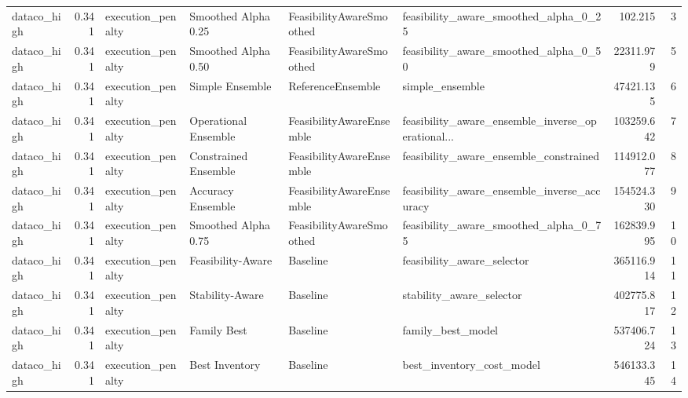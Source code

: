 \begin{table}
{\begin{tabular}{lrllllrr}
   dataco\_high &             0.341 &           execution\_penalty &   Smoothed Alpha 0.25 &  FeasibilityAwareSmoothed &              feasibility\_aware\_smoothed\_alpha\_0\_25 &       102.215 &               3 \\
   dataco\_high &             0.341 &           execution\_penalty &   Smoothed Alpha 0.50 &  FeasibilityAwareSmoothed &              feasibility\_aware\_smoothed\_alpha\_0\_50 &     22311.979 &               5 \\
   dataco\_high &             0.341 &           execution\_penalty &       Simple Ensemble &         ReferenceEnsemble &                                    simple\_ensemble &     47421.135 &               6 \\
   dataco\_high &             0.341 &           execution\_penalty &  Operational Ensemble &  FeasibilityAwareEnsemble &  feasibility\_aware\_ensemble\_inverse\_operational... &    103259.642 &               7 \\
   dataco\_high &             0.341 &           execution\_penalty &  Constrained Ensemble &  FeasibilityAwareEnsemble &             feasibility\_aware\_ensemble\_constrained &    114912.077 &               8 \\
   dataco\_high &             0.341 &           execution\_penalty &     Accuracy Ensemble &  FeasibilityAwareEnsemble &        feasibility\_aware\_ensemble\_inverse\_accuracy &    154524.330 &               9 \\
   dataco\_high &             0.341 &           execution\_penalty &   Smoothed Alpha 0.75 &  FeasibilityAwareSmoothed &              feasibility\_aware\_smoothed\_alpha\_0\_75 &    162839.995 &              10 \\
   dataco\_high &             0.341 &           execution\_penalty &     Feasibility-Aware &                  Baseline &                         feasibility\_aware\_selector &    365116.914 &              11 \\
   dataco\_high &             0.341 &           execution\_penalty &       Stability-Aware &                  Baseline &                           stability\_aware\_selector &    402775.817 &              12 \\
   dataco\_high &             0.341 &           execution\_penalty &           Family Best &                  Baseline &                                  family\_best\_model &    537406.724 &              13 \\
   dataco\_high &             0.341 &           execution\_penalty &        Best Inventory &                  Baseline &                          best\_inventory\_cost\_model &    546133.345 &              14 \\

\end{tabular}}
\end{table}
